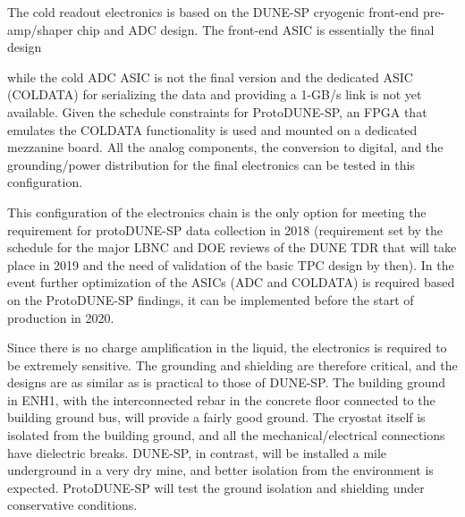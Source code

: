 The cold readout electronics  is based on the DUNE-SP cryogenic front-end pre-amp/shaper chip and ADC design. The front-end ASIC is essentially the final design {%
while the cold ADC ASIC is not the final version and the dedicated ASIC (COLDATA) for serializing the data and providing a 1-GB/s link is not yet available. Given the schedule constraints for ProtoDUNE-SP, an FPGA that emulates the COLDATA functionality is used and mounted on a dedicated mezzanine board. %
All the analog components, the conversion to digital, and the grounding/power distribution for the final electronics can be tested in this configuration.  

This configuration of the electronics chain is the only option for meeting the requirement for protoDUNE-SP data collection in 2018 (requirement set by the schedule for the major LBNC and DOE reviews of the DUNE TDR that will take place in 2019 and the need of validation of the basic TPC design by then).
In the event further optimization of the ASICs (ADC and COLDATA) is required based on the ProtoDUNE-SP findings, it can be implemented before the start of production in 2020. 

Since there is no charge amplification in the liquid, the electronics is required to be extremely sensitive. The grounding and shielding are therefore critical, and the designs are as similar as is practical to those of DUNE-SP. The building ground in ENH1, with the interconnected rebar in the concrete floor 
connected to the building ground bus, will provide a fairly good ground. The cryostat itself is isolated from the building ground, and all the mechanical/electrical connections have dielectric breaks. DUNE-SP, in contrast, will be installed a mile underground in a very dry mine, and better isolation from the environment is expected. ProtoDUNE-SP will test the ground isolation and shielding under conservative conditions.


}
